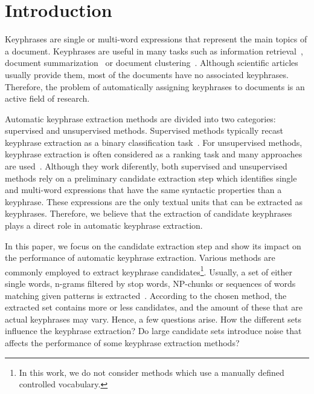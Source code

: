 \section{Introduction}
\label{sec:section}
  Keyphrases are single or multi-word expressions that represent the main topics
  of a document. Keyphrases are useful in many tasks such as information
  retrieval~\cite{medelyan2008smalltrainingset}, document
  summarization~\cite{litvak2008graphbased} or document
  clustering~\cite{han2007webdocumentclustering}. Although scientific articles
  usually provide them, most of the documents have no associated keyphrases.
  Therefore, the problem of automatically assigning keyphrases to documents is
  an active field of research.

  Automatic keyphrase extraction methods are divided into two categories:
  supervised and unsupervised methods. Supervised methods typically recast
  keyphrase extraction as a binary classification
  task~\cite{witten1999kea,sujian2003maximumentropy,eichler2010keywe}. For
  unsupervised methods, keyphrase extraction is often considered as a ranking
  task and many approaches are
  used~\cite{barker2000nounphrasehead,mihalcea2004textrank}. Although they work
  diferently, both supervised and unsupervised methods rely on a preliminary
  candidate extraction step which identifies single and multi-word expressions
  that have the same syntactic properties than a keyphrase. These expressions
  are the only textual units that can be extracted as keyphrases. Therefore, we
  believe that the extraction of candidate keyphrases plays a direct role in
  automatic keyphrase extraction.
  
  In this paper, we focus on the candidate extraction step and show its impact
  on the performance of automatic keyphrase extraction. Various methods
  are commonly employed to extract keyphrase candidates\footnote{In this work,
  we do not consider methods which use a manually defined controlled
  vocabulary.}. Usually, a set of either single words, n-grams filtered by stop
  words, NP-chunks or sequences of words matching given patterns is
  extracted~\cite{hulth2003keywordextraction}. According to the chosen method,
  the extracted set contains more or less candidates, and the amount of these
  that are actual keyphrases may vary. Hence, a few questions arise. How the
  different sets influence the keyphrase extraction? Do large candidate sets
  introduce noise that affects the performance of some keyphrase extraction
  methods?

